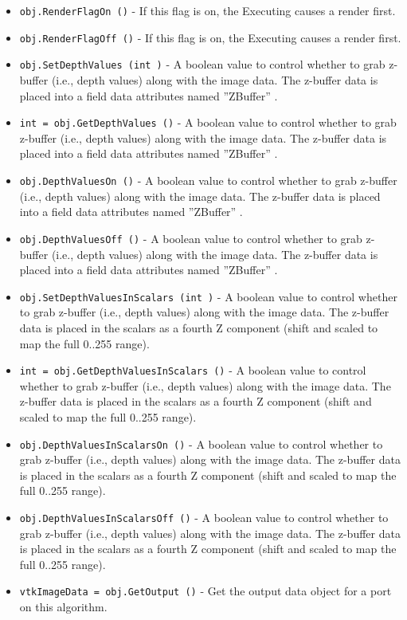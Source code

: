 \begin{itemize}
\item  \verb|obj.RenderFlagOn ()| -  If this flag is on, the Executing causes a render first.

\item  \verb|obj.RenderFlagOff ()| -  If this flag is on, the Executing causes a render first.

\item  \verb|obj.SetDepthValues (int )| -  A boolean value to control whether to grab z-buffer 
 (i.e., depth values) along with the image data. The z-buffer data
 is placed into a field data attributes named ''ZBuffer'' .

\item  \verb|int = obj.GetDepthValues ()| -  A boolean value to control whether to grab z-buffer 
 (i.e., depth values) along with the image data. The z-buffer data
 is placed into a field data attributes named ''ZBuffer'' .

\item  \verb|obj.DepthValuesOn ()| -  A boolean value to control whether to grab z-buffer 
 (i.e., depth values) along with the image data. The z-buffer data
 is placed into a field data attributes named ''ZBuffer'' .

\item  \verb|obj.DepthValuesOff ()| -  A boolean value to control whether to grab z-buffer 
 (i.e., depth values) along with the image data. The z-buffer data
 is placed into a field data attributes named ''ZBuffer'' .

\item  \verb|obj.SetDepthValuesInScalars (int )| -  A boolean value to control whether to grab z-buffer 
 (i.e., depth values) along with the image data. The z-buffer data
 is placed in the scalars as a fourth Z component (shift and scaled
 to map the full 0..255 range).

\item  \verb|int = obj.GetDepthValuesInScalars ()| -  A boolean value to control whether to grab z-buffer 
 (i.e., depth values) along with the image data. The z-buffer data
 is placed in the scalars as a fourth Z component (shift and scaled
 to map the full 0..255 range).

\item  \verb|obj.DepthValuesInScalarsOn ()| -  A boolean value to control whether to grab z-buffer 
 (i.e., depth values) along with the image data. The z-buffer data
 is placed in the scalars as a fourth Z component (shift and scaled
 to map the full 0..255 range).

\item  \verb|obj.DepthValuesInScalarsOff ()| -  A boolean value to control whether to grab z-buffer 
 (i.e., depth values) along with the image data. The z-buffer data
 is placed in the scalars as a fourth Z component (shift and scaled
 to map the full 0..255 range).

\item  \verb|vtkImageData = obj.GetOutput ()| -  Get the output data object for a port on this algorithm.

\end{itemize}
